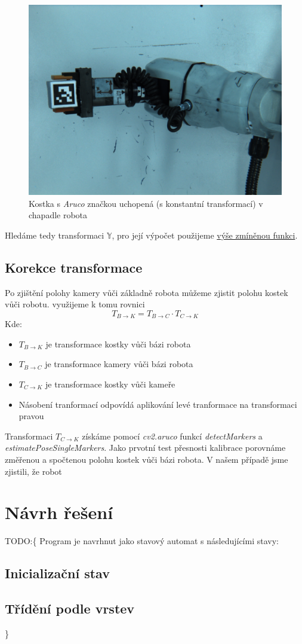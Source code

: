 \documentclass[journal,twoside,web]{ieeecolor}
\begin{document}
    \begin{figure}[h!]
        \centering
          \includegraphics[width=0.8\linewidth]{images/Hand2eye.png}
        \caption{Kostka s \textit{Aruco} značkou uchopená (s konstantní transformací) v chapadle robota}
        \label{fig:ArucoInHand}
    \end{figure}
    Hledáme tedy transformaci $\mathbb{Y}$, pro její výpočet použijeme \hyperlink{cv2Handeye}{výše zmíněnou funkci}.

    \subsection{Korekce transformace}
        Po zjištění polohy kamery vůči základně robota můžeme zjistit polohu kostek vůči robotu. využijeme
        k tomu rovnici
        \begin{equation}
            T_{B\rightarrow K} = T_{B\rightarrow C} \cdot T_{C \rightarrow K}
        \end{equation}
        Kde:
    \begin{itemize}
        \item $T_{B\rightarrow K}$ je transformace kostky vůči bázi robota\\
        \item $T_{B\rightarrow C}$ je transformace kamery vůči bázi robota\\
        \item $T_{C\rightarrow K}$ je transformace kostky vůči kameře\\
        \item Násobení tranformací odpovídá aplikování levé tranformace na transformaci pravou
    \end{itemize}
    Transformaci $T_{C\rightarrow K}$ získáme pomocí \textit{cv2.aruco} funkcí \textit{detectMarkers} a 
    \textit{estimatePoseSingleMarkers}. Jako prvotní test přesnosti kalibrace porovnáme změřenou a spočtenou
    polohu kostek vůči bázi robota. V našem případě jsme zjistili, že robot
    \section{Návrh řešení}
    TODO:\{
    Program je navrhnut jako stavový automat s následujícími stavy:
    \subsection{Inicializační stav}
    \subsection{Třídění podle vrstev}\}
    
\end{document}
